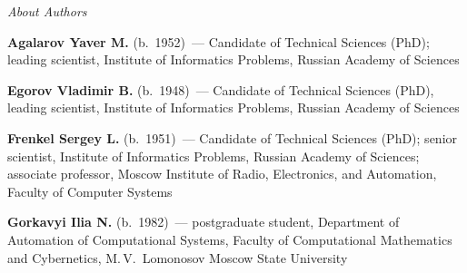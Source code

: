 
\begin{center}\LARGE
\textit{About Authors}
\end{center}
\thispagestyle{empty}

\vspace*{24pt}


\begin{multicols}{2}

\noindent
\textbf{Agalarov Yaver M.} (b.\ 1952)~--- Candidate of Technical Sciences (PhD); 
leading scientist,
Institute of Informatics
Problems, Russian Academy of Sciences





\vspace*{3pt}




\noindent %
\textbf{Egorov Vladimir B.} (b.\ 1948)~--- Candidate of Technical Sciences (PhD),
leading scientist,
Institute of Informatics Problems, Russian Academy of Sciences

\vspace*{3pt}

\noindent
\textbf{Frenkel Sergey L.} (b.\ 1951)~--- Candidate of Technical Sciences (PhD);
senior scientist, Institute of Informatics Problems,
Russian Academy of Sciences; associate professor, Moscow Institute of
Radio, Electronics, and Automation, Faculty of Computer Systems

\vspace*{3pt}

\noindent
\textbf{Gorkavyi Ilia N.} (b.\ 1982)~--- postgraduate student,
Department of Automation of Computational Systems,
Faculty of  Computational
Mathematics and Cybernetics, M.\,V.~Lomonosov Moscow State University


\end{multicols}
